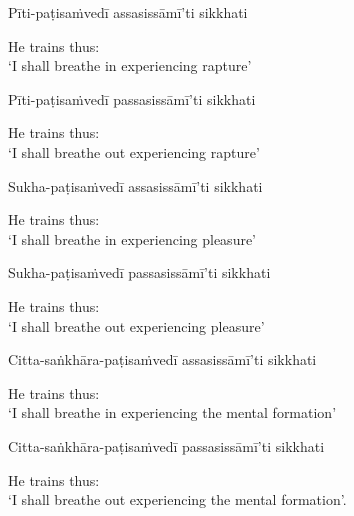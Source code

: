 Pīti-paṭisaṁvedī assasissāmī'ti sikkhati

\begin{english}
  He trains thus:\\
  `I shall breathe in experiencing rapture'
\end{english}

Pīti-paṭisaṁvedī passasissāmī'ti sikkhati

\begin{english}
  He trains thus:\\
  `I shall breathe out experiencing rapture'
\end{english}

Sukha-paṭisaṁvedī assasissāmī'ti sikkhati

\begin{english}
  He trains thus:\\
  `I shall breathe in experiencing pleasure'
\end{english}

Sukha-paṭisaṁvedī passasissāmī'ti sikkhati

\begin{english}
  He trains thus:\\
  `I shall breathe out experiencing pleasure'
\end{english}

Citta-saṅkhāra-paṭisaṁvedī assasissāmī'ti sikkhati

\begin{english}
  He trains thus:\\
  `I shall breathe in experiencing the mental formation'\makeatletter\hyperlink{endnote69-appendix}\makeatother
\end{english}

Citta-saṅkhāra-paṭisaṁvedī passasissāmī'ti sikkhati

\begin{english}
  He trains thus:\\
  `I shall breathe out experiencing the mental formation'.
\end{english}

